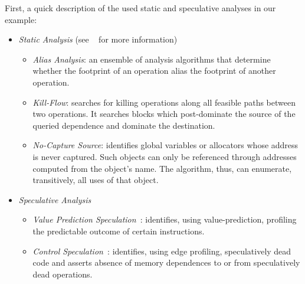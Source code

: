First, a quick description of the used static and speculative analyses in our
example:
%
\begin{itemize}
%
\item \textit{Static Analysis} (see ~\cite{johnson:17:cgo} for more information)
%
  \begin{itemize}
%
  \item \textit{Alias Analysis}: an ensemble of analysis algorithms that
determine whether the footprint of an operation alias the footprint of another
operation.
%
  \item \textit{Kill-Flow}: searches for killing operations along all feasible
paths between two operations. It searches blocks which post-dominate the source
of the queried dependence and dominate the destination.
%
  \item \textit{No-Capture Source}: identifies global variables or allocators
whose address is never captured. Such objects can only be referenced through
addresses computed from the object's name. The algorithm, thus, can enumerate,
transitively, all uses of that object.
%
\end{itemize}
%
\item \textit{Speculative Analysis}
%
\begin{itemize}
%
  \item \textit{Value Prediction Speculation~\cite{}}: identifies, using
value-prediction, profiling the predictable outcome of certain instructions.
%
  \item \textit{Control Speculation~\cite{}}: identifies, using edge profiling,
speculatively dead code and asserts absence of memory dependences to or from
speculatively dead operations.
%
\end{itemize}
%
\end{itemize}
%

\lstset{basicstyle=\ttfamily, numbers=left, numberstyle=\tiny,
  stepnumber=1, numbersep=5pt}
\begin{figure*}[t]
  \centering
  \scriptsize
  \subfloat[dijkstra]
  {
    \label{fig:dijkstra}
    \begin{minipage}{7.5cm}
      
    \end{minipage}
  }
\end{figure*}

